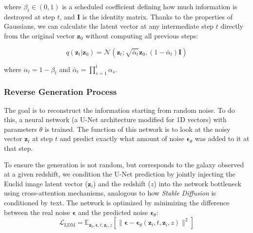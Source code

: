 where $\beta_t \in (0, 1)$ is a scheduled coefficient defining how much information is destroyed at step $t$, and $\mathbf{I}$ is the identity matrix. Thanks to the properties of Gaussians, we can calculate the latent vector at any intermediate step $t$ directly from the original vector $\mathbf{z}_0$ without computing all previous steps:

\begin{equation}
q(\mathbf{z}_t | \mathbf{z}_0) = \mathcal{N}\left(\mathbf{z}_t; \sqrt{\bar{\alpha}_t} \mathbf{z}_0, (1 - \bar{\alpha}_t) \mathbf{I}\right)
\label{eq:ap_forward_direct}
\end{equation}

where $\alpha_t = 1 - \beta_t$ and $\bar{\alpha}_t = \prod_{s=1}^t \alpha_s$.

\subsubsection{Reverse Generation Process}

The goal is to reconstruct the information starting from random noise. To do this, a neural network (a U-Net architecture modified for 1D vectors) with parameters $\theta$ is trained. The function of this network is to look at the noisy vector $\mathbf{z}_t$ at step $t$ and predict exactly what amount of noise $\boldsymbol{\epsilon}_\theta$ was added to it at that step.

To ensure the generation is not random, but corresponds to the galaxy observed at a given redshift, we condition the U-Net prediction by jointly injecting the Euclid image latent vector ($\mathbf{z}_i$) and the redshift ($z$) into the network bottleneck using cross-attention mechanisms, analogous to how \textit{Stable Diffusion} is conditioned by text. The network is optimized by minimizing the difference between the real noise $\boldsymbol{\epsilon}$ and the predicted noise $\boldsymbol{\epsilon}_\theta$:
\begin{equation}
\mathcal{L}_{\text{LDM}} = \mathbb{E}_{\mathbf{z}_0, \boldsymbol{\epsilon}, t, \mathbf{z}_i, z} \left[ \|\boldsymbol{\epsilon} - \boldsymbol{\epsilon}_\theta(\mathbf{z}_t, t, \mathbf{z}_i, z)\|^2 \right]
\label{eq:ap_ldm_loss}
\end{equation}


